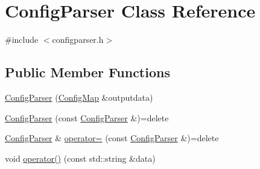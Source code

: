 \hypertarget{class_config_parser}{\section{Config\+Parser Class Reference}
\label{class_config_parser}
}


{\ttfamily \#include $<$configparser.\+h$>$}

\subsection*{Public Member Functions}
\begin{DoxyCompactItemize}
\item 
\hyperlink{class_config_parser_ab27af90f700026dea6b6be316e92007d}{Config\+Parser} (\hyperlink{class_config_map}{Config\+Map} \&outputdata)
\item 
\hyperlink{class_config_parser_a8aeaba7ef6828e1ff00cf5132db4b7ca}{Config\+Parser} (const \hyperlink{class_config_parser}{Config\+Parser} \&)=delete
\item 
\hyperlink{class_config_parser}{Config\+Parser} \& \hyperlink{class_config_parser_aa88e1ae2b7e188a6eca647bc477a44a6}{operator=} (const \hyperlink{class_config_parser}{Config\+Parser} \&)=delete
\item 
void \hyperlink{class_config_parser_a2c01300a877520a753e3360232d4cbba}{operator()} (const std\+::string \&data)
\end{DoxyCompactItemize}


